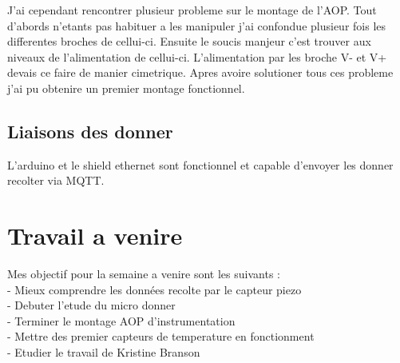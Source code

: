 \documentclass[5pt]{article}
\begin{document}
J'ai cependant rencontrer plusieur probleme sur le montage de l'AOP. Tout d'abords n'etants pas habituer 
a les manipuler j'ai confondue plusieur fois les differentes broches de cellui-ci. Ensuite le soucis manjeur 
c'est trouver aux niveaux de l'alimentation de cellui-ci. L'alimentation par les broche V- et V+ devais ce faire 
de manier cimetrique. 
Apres avoire solutioner tous ces probleme j'ai pu obtenire un premier montage fonctionnel.

\subsection{Liaisons des donner}
L'arduino et le shield ethernet sont fonctionnel et capable d'envoyer les donner recolter via MQTT.

\section{Travail a venire}
Mes objectif pour la semaine a venire sont les suivants :\\
	- Mieux comprendre les données recolte par le capteur piezo\\
	- Debuter l'etude du micro donner\\
	- Terminer le montage AOP d'instrumentation\\
	- Mettre des premier capteurs de temperature en fonctionment\\
	- Etudier le travail de Kristine Branson\\

\newpage
\listoffigures
\end{document}
